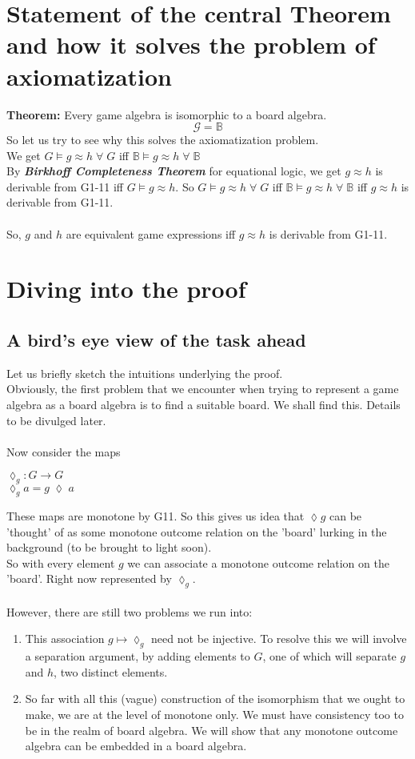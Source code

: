 \documentclass[12pt]{article}
\begin{document}
\section{Statement of the central Theorem and how it solves the problem of axiomatization}
\textbf{Theorem:} Every game algebra is isomorphic to a board algebra. 
\[
\mathcal{G}=\mathbb{B}\]
So let us try to see why this solves the axiomatization problem.\\ We get $G \vDash g \approx h  \; \forall \; G$ iff $\mathbb{B} \vDash g \approx h \; \forall \; \mathbb{B}$ \\
By \textbf{\emph{Birkhoff Completeness Theorem}} for equational logic, we get $g \approx h$ is derivable from G1-11 iff $G \vDash g \approx h$. So $G \vDash g \approx h \; \forall \; G$ iff $\mathbb{B} \vDash g \approx h \; \forall \; \mathbb{B}$ iff $g \approx h$ is derivable from G1-11.\\ \\
So, $g$ and $h$ are equivalent game expressions iff $g \approx h$ is derivable from G1-11. 
\section{Diving into the proof}
\subsection{A bird's eye view of the task ahead}
Let us briefly sketch the intuitions underlying the proof. \\
Obviously, the first problem that we encounter when trying to represent a game algebra as a board algebra is to find a suitable board. We shall find this. Details to be divulged later. \\ \\
Now consider the maps \\
\begin{center}
   $\lozenge_{g}: G \to G$ \\
   $\lozenge_{g}a=g \; \lozenge \; a$ \\
\end{center}
These maps are monotone by G11. So this gives us idea that $\lozenge g$ can be 'thought' of as some monotone outcome relation on the 'board' lurking in the background (to be brought to light soon).\\
So with every element $g$ we can associate a monotone outcome relation on the 'board'. Right now represented by $\lozenge_g$. \\ \\
However, there are still two problems we run into: 
\begin{enumerate}
    \item This association $g \mapsto\lozenge_g$ need not be injective. To resolve this we will involve a separation argument, by adding elements to $G$, one of which will separate $g$ and $h$, two distinct elements. 
    \item So far with all this (vague) construction of the isomorphism that we ought to make, we are at the level of monotone only. We must have consistency too to be in the realm of board algebra. We will show that any monotone outcome algebra can be embedded in a board algebra. 
\end{enumerate}
\end{document}
